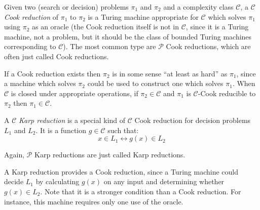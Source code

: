 \documentclass[12pt]{article}
\begin{document}
Given two (search or decision) problems $\pi_1$ and $\pi_2$ and a complexity class $\mathcal{C}$, a $\mathcal{C}$ \emph{Cook reduction} of $\pi_1$ to $\pi_2$ is a Turing machine appropriate for $\mathcal{C}$ which solves $\pi_1$ using $\pi_2$ as an oracle (the Cook reduction itself is not in $\mathcal{C}$, since it is a Turing machine, not a problem, but it should be the class of bounded Turing machines corresponding to $\mathcal{C}$).  The most common type are $\mathcal{P}$ Cook reductions, which are often just called Cook reductions.

If a Cook reduction exists then $\pi_2$ is in some sense ``at least as hard'' as $\pi_1$, since a machine which solves $\pi_2$ could be used to construct one which solves $\pi_1$.  When $\mathcal{C}$ is closed under appropriate operations, if $\pi_2\in\mathcal{C}$ and $\pi_1$ is $\mathcal{C}$-Cook reducible to $\pi_2$ then $\pi_1\in\mathcal{C}$.

A $\mathcal{C}$ \emph{Karp reduction} is a special kind of $\mathcal{C}$ Cook reduction for decision problems $L_1$ and $L_2$.  It is a function $g\in\mathcal{C}$ such that:
$$x\in L_1\leftrightarrow g(x)\in L_2$$

Again, $\mathcal{P}$ Karp reductions are just called Karp reductions.

A Karp reduction provides a Cook reduction, since a Turing machine could decide $L_1$ by calculating $g(x)$ on any input and determining whether $g(x)\in L_2$.  Note that it is a stronger condition than a Cook reduction.  For instance, this machine requires only one use of the oracle.
\end{document}
